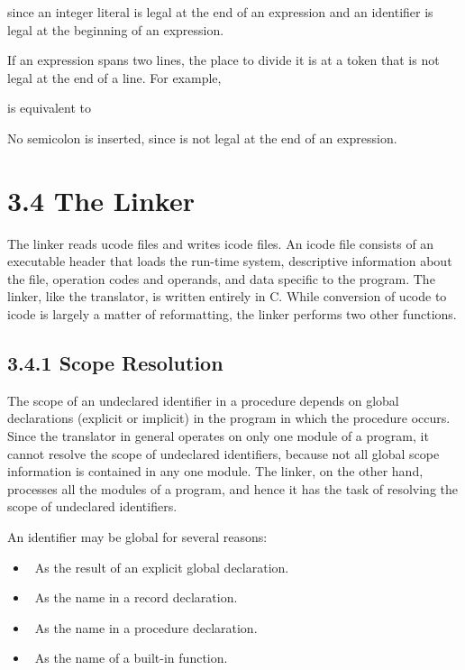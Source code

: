 
\noindent since an integer literal is legal at the end of an
expression and an identifier is legal at the beginning of an
expression.

If an expression spans two lines, the place to divide it is at a token
that is not legal at the end of a line. For example,


\noindent is equivalent to


\noindent No semicolon is inserted, since
\texttt{{\textbar}{\textbar}} is not legal at the end of an
expression.

\section[3.4 The Linker]{3.4 The Linker}

The linker reads ucode files and writes icode files. An icode file
consists of an executable header that loads the run-time system,
descriptive information about the file, operation codes and operands,
and data specific to the program. The linker, like the translator, is
written entirely in C. While conversion of ucode to icode is largely a
matter of reformatting, the linker performs two other functions.

\subsection[3.4.1 Scope Resolution]{3.4.1 Scope Resolution}

The scope of an undeclared identifier in a procedure depends on global
declarations (explicit or implicit) in the program in which the
procedure occurs. Since the translator in general operates on only one
module of a program, it cannot resolve the scope of undeclared
identifiers, because not all global scope information is contained in
any one module. The linker, on the other hand, processes all the
modules of a program, and hence it has the task of resolving the scope
of undeclared identifiers.

An identifier may be global for several reasons:

\liststyleLii
\begin{itemize}
\item 
\ As the result of an explicit global declaration.
\item 
\ As the name in a record declaration.
\item 
\ As the name in a procedure declaration.
\item 
\ As the name of a built-in function.
\end{itemize}

